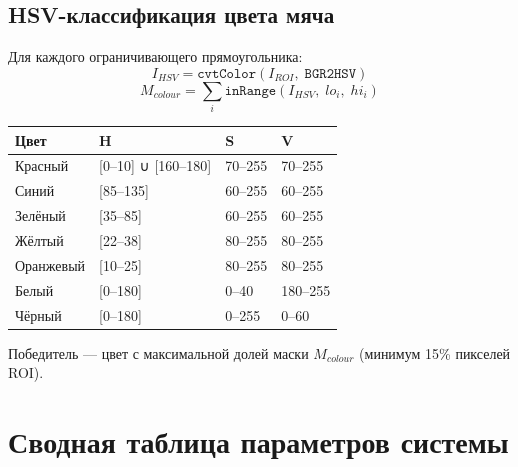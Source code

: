 \documentclass[12pt, a4paper]{article}
\begin{document}
\subsection{HSV-классификация цвета мяча}

Для каждого ограничивающего прямоугольника:
\begin{equation}
  I_{HSV} = \texttt{cvtColor}(I_{ROI},\; \texttt{BGR2HSV})
\end{equation}
\begin{equation}
  M_{colour} = \sum_i \texttt{inRange}(I_{HSV},\; lo_i,\; hi_i)
\end{equation}
\begin{center}
\begin{tabular}{llll}
\toprule
\textbf{Цвет} & \textbf{H} & \textbf{S} & \textbf{V} \\
\midrule
Красный   & [0–10] ∪ [160–180] & 70–255 & 70–255 \\
Синий     & [85–135]  & 60–255 & 60–255 \\
Зелёный   & [35–85]   & 60–255 & 60–255 \\
Жёлтый    & [22–38]   & 80–255 & 80–255 \\
Оранжевый & [10–25]   & 80–255 & 80–255 \\
Белый     & [0–180]   & 0–40   & 180–255 \\
Чёрный    & [0–180]   & 0–255  & 0–60 \\
\bottomrule
\end{tabular}
\end{center}

Победитель — цвет с максимальной долей маски $M_{colour}$ (минимум 15\% пикселей ROI).

\newpage
\section{Сводная таблица параметров системы}
\label{sec:params}
\end{document}
